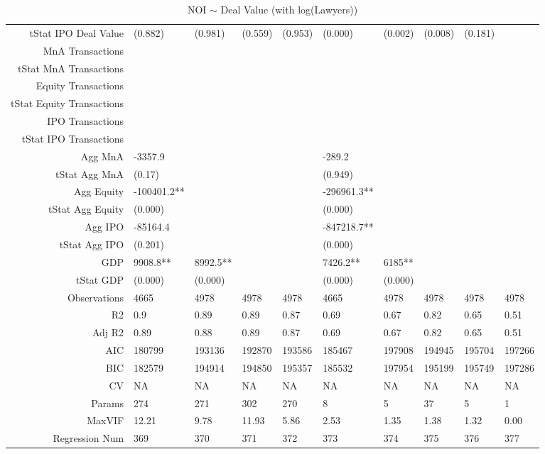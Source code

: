 \begin{table}[ht]
\begin{tabular}{rlllllllll}
  tStat IPO Deal Value & (0.882) & (0.981) & (0.559) & (0.953) & (0.000) & (0.002) & (0.008) & (0.181) &  \\ 
  MnA Transactions &  &  &  &  &  &  &  &  &  \\ 
  tStat MnA Transactions &  &  &  &  &  &  &  &  &  \\ 
  Equity Transactions &  &  &  &  &  &  &  &  &  \\ 
  tStat Equity Transactions &  &  &  &  &  &  &  &  &  \\ 
  IPO Transactions &  &  &  &  &  &  &  &  &  \\ 
  tStat IPO Transactions &  &  &  &  &  &  &  &  &  \\ 
  Agg MnA & -3357.9 &  &  &  & -289.2 &  &  &  &  \\ 
  tStat Agg MnA & (0.17) &  &  &  & (0.949) &  &  &  &  \\ 
  Agg Equity & -100401.2** &  &  &  & -296961.3** &  &  &  &  \\ 
  tStat Agg Equity & (0.000) &  &  &  & (0.000) &  &  &  &  \\ 
  Agg IPO & -85164.4 &  &  &  & -847218.7** &  &  &  &  \\ 
  tStat Agg IPO & (0.201) &  &  &  & (0.000) &  &  &  &  \\ 
  GDP & 9908.8** & 8992.5** &  &  & 7426.2** & 6185** &  &  &  \\ 
  tStat GDP & (0.000) & (0.000) &  &  & (0.000) & (0.000) &  &  &  \\ 
  Observations & 4665 & 4978 & 4978 & 4978 & 4665 & 4978 & 4978 & 4978 & 4978 \\ 
  R2 & 0.9 & 0.89 & 0.89 & 0.87 & 0.69 & 0.67 & 0.82 & 0.65 & 0.51 \\ 
  Adj R2 & 0.89 & 0.88 & 0.89 & 0.87 & 0.69 & 0.67 & 0.82 & 0.65 & 0.51 \\ 
  AIC & 180799 & 193136 & 192870 & 193586 & 185467 & 197908 & 194945 & 195704 & 197266 \\ 
  BIC & 182579 & 194914 & 194850 & 195357 & 185532 & 197954 & 195199 & 195749 & 197286 \\ 
  CV & NA & NA & NA & NA & NA & NA & NA & NA & NA \\ 
  Params & 274 & 271 & 302 & 270 & 8 & 5 & 37 & 5 & 1 \\ 
  MaxVIF & 12.21 & 9.78 & 11.93 & 5.86 & 2.53 & 1.35 & 1.38 & 1.32 & 0.00 \\ 
  Regression Num & 369 & 370 & 371 & 372 & 373 & 374 & 375 & 376 & 377 \\ 
   \hline
\end{tabular}
\caption{NOI $\sim$ Deal Value (with log(Lawyers))} 
\end{table}
